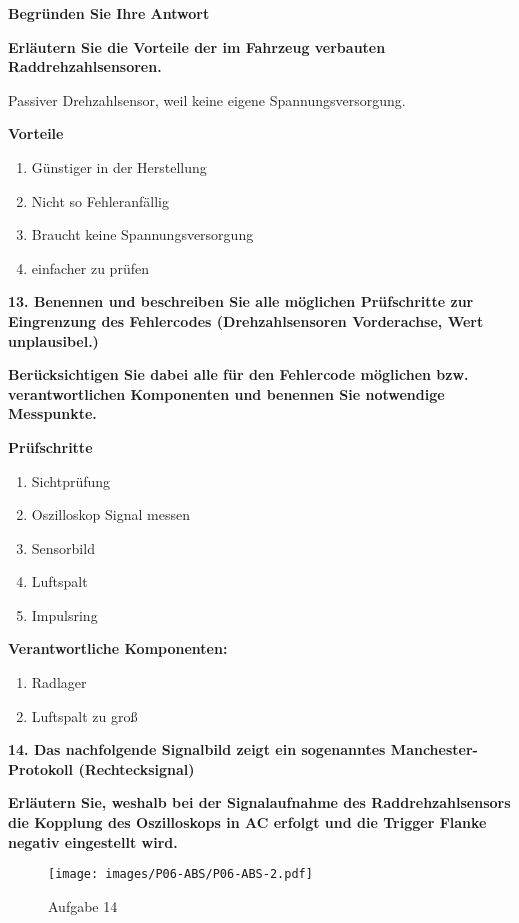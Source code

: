 \textbf{Begründen Sie Ihre Antwort}

\textbf{Erläutern Sie die Vorteile der im Fahrzeug verbauten
Raddrehzahlsensoren.}

Passiver Drehzahlsensor, weil keine eigene Spannungsversorgung.

\textbf{Vorteile}

\begin{enumerate}
\item
  Günstiger in der Herstellung
\item
  Nicht so Fehleranfällig
\item
  Braucht keine Spannungsversorgung
\item
  einfacher zu prüfen
\end{enumerate}

\textbf{13. Benennen und beschreiben Sie alle möglichen Prüfschritte zur
Eingrenzung des Fehlercodes (Drehzahlsensoren Vorderachse, Wert
unplausibel.)}

\textbf{Berücksichtigen Sie dabei alle für den Fehlercode möglichen bzw.
verantwortlichen Komponenten und benennen Sie notwendige Messpunkte.}

\textbf{Prüfschritte}

\begin{enumerate}
\item
  Sichtprüfung
\item
  Oszilloskop Signal messen
\item
  Sensorbild
\item
  Luftspalt
\item
  Impulsring
\end{enumerate}

\textbf{Verantwortliche Komponenten:}

\begin{enumerate}
\item
  Radlager
\item
  Luftspalt zu groß
\end{enumerate}

\newpage

\textbf{14. Das nachfolgende Signalbild zeigt ein sogenanntes
Manchester-Protokoll (Rechtecksignal)}

\textbf{Erläutern Sie, weshalb bei der Signalaufnahme des
Raddrehzahlsensors die Kopplung des Oszilloskops in AC erfolgt und die
Trigger Flanke negativ eingestellt wird.}

\begin{figure}[!ht]%
\centering
\texttt{[image: images/P06-ABS/P06-ABS-2.pdf]}
\caption{Aufgabe 14}
\end{figure}

